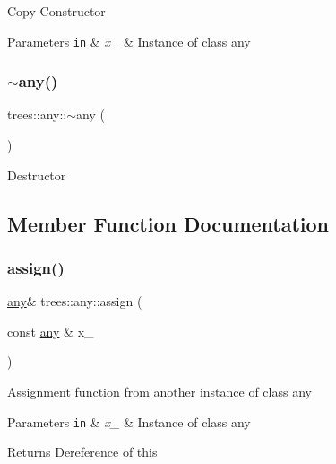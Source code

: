 Copy Constructor


\begin{DoxyParams}[1]{Parameters}
\mbox{\tt in}  & {\em x\+\_\+} & Instance of class any \\
\hline
\end{DoxyParams}
\mbox{\label{classtrees_1_1any_a868cb1536d483870e821cfb0951081ba}} 
\subsubsection{\texorpdfstring{$\sim$any()}{~any()}}
{\footnotesize\ttfamily trees\+::any\+::$\sim$any (\begin{DoxyParamCaption}{ }\end{DoxyParamCaption})\hspace{0.3cm}{\ttfamily [inline]}}

Destructor 

\subsection{Member Function Documentation}
\mbox{\label{classtrees_1_1any_a25ef43f8c96240c237e972acaae51cba}} 
\subsubsection{\texorpdfstring{assign()}{assign()}\hspace{0.1cm}{\footnotesize\ttfamily [1/2]}}
{\footnotesize\ttfamily \hyperlink{classtrees_1_1any}{any}\& trees\+::any\+::assign (\begin{DoxyParamCaption}\item[{const \hyperlink{classtrees_1_1any}{any} \&}]{x\+\_\+ }\end{DoxyParamCaption})\hspace{0.3cm}{\ttfamily [inline]}}

Assignment function from another instance of class any


\begin{DoxyParams}[1]{Parameters}
\mbox{\tt in}  & {\em x\+\_\+} & Instance of class any \\
\hline
\end{DoxyParams}
\begin{DoxyReturn}{Returns}
Dereference of this 
\end{DoxyReturn}
\mbox{\label{classtrees_1_1any_ae4cad6b85b6f7810d750fccc500a11c9}} 
